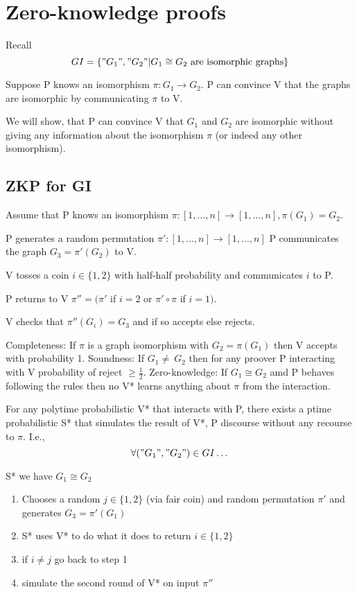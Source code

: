 \documentclass[a4paper,12pt]{article}
\theoremstyle{definition}
\theoremstyle{remark}
\begin{document}
\newpage
\section{Zero-knowledge proofs}

Recall
\begin{equation*}
    GI = \{"G_1", "G_2" | G_1 \cong G_2 \text{ are isomorphic graphs}\}
\end{equation*}

Suppose P knows an isomorphism $\pi: G_1 \to G_2$. P can convince V that the graphs are isomorphic by 
communicating $\pi$ to V.

We will show, that P can convince V that $G_1$ and $G_2$ are isomorphic without giving any information about the isomorphism
$\pi$ (or indeed any other isomorphism).

\subsection{ZKP for GI}
Assume that P knows an isomorphism $\pi: [1, \dots, n] \to [1, \dots, n], \pi (G_1) = G_2$.

P generates a random permutation $\pi': [1, \dots, n] \to [1, \dots, n]$
P communicates the graph $G_3 = \pi'(G_2)$ to V.

V tosses a coin $i \in \{1, 2\}$ with half-half probability and communicates $i$ to P.

P returns to V $\pi'' = (\pi'$ if $i = 2$ or $\pi' \circ \pi$ if $i = 1)$.

V checks that $\pi''(G_i) = G_3$ and if so accepts else rejects.

Completeness: If $\pi$ is a graph isomorphism with $G_2 = \pi(G_1)$ then V accepts with probability 1.
Soundness: If $G_1 \neq~ G_2$ then for any proover P interacting with V probability of reject $\geq \frac{1}{2}$.
Zero-knowledge: If $G_1 \cong G_2$ amd P behaves following the rules then no V* learns anything about $\pi$ from the interaction.

For any polytime probabilistic V* that interacts with P, there exists a ptime probabilistic S* that simulates the result
of V*, P discourse without any recourse to $\pi$. I.e.,
\begin{equation*}
    \forall ("G_1", "G_2") \in GI \dots
\end{equation*}

S* we have $G_1 \cong G_2$
\begin{enumerate}
    \item Chooses a random $j \in \{1, 2\}$ (via fair coin) and random permutation $\pi'$ and generates $G_3 = \pi'(G_1)$
    \item S* uses V* to do what it does to return $i \in \{1, 2\}$
    \item if $i \neq j$ go back to step 1
    \item simulate the second round of V* on input $\pi''$
\end{enumerate}
\end{document}
